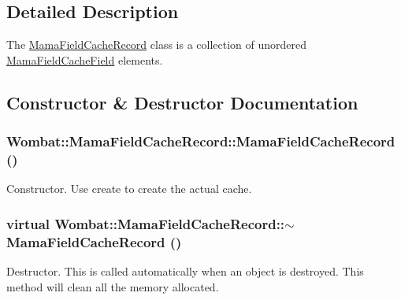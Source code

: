 \subsection{Detailed Description}
The {\ttfamily \hyperlink{classWombat_1_1MamaFieldCacheRecord}{MamaFieldCacheRecord}} class is a collection of unordered {\ttfamily \hyperlink{classWombat_1_1MamaFieldCacheField}{MamaFieldCacheField}} elements. 

\subsection{Constructor \& Destructor Documentation}
\hypertarget{classWombat_1_1MamaFieldCacheRecord_a75145dcdba920aff38f3bc4b1a4fcda3}{
\subsubsection[{MamaFieldCacheRecord}]{\setlength{\rightskip}{0pt plus 5cm}Wombat::MamaFieldCacheRecord::MamaFieldCacheRecord ()}}
\label{classWombat_1_1MamaFieldCacheRecord_a75145dcdba920aff38f3bc4b1a4fcda3}


Constructor. Use {\ttfamily create} to create the actual cache. \hypertarget{classWombat_1_1MamaFieldCacheRecord_a967822701415a8d1652cd58a9f1fd33b}{
\subsubsection[{$\sim$MamaFieldCacheRecord}]{\setlength{\rightskip}{0pt plus 5cm}virtual Wombat::MamaFieldCacheRecord::$\sim$MamaFieldCacheRecord ()}}
\label{classWombat_1_1MamaFieldCacheRecord_a967822701415a8d1652cd58a9f1fd33b}


Destructor. This is called automatically when an object is destroyed. This method will clean all the memory allocated. 

